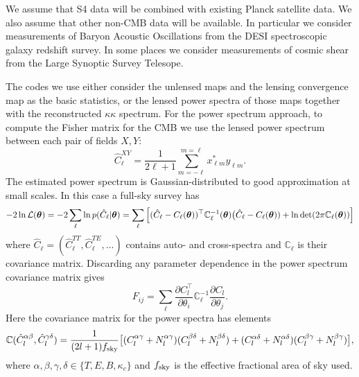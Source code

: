 We assume that S4 data will be combined with existing Planck satellite data. We also assume that other non-CMB data will be available. In particular we consider measurements of Baryon Acoustic Oscillations from the DESI spectroscopic galaxy redshift survey. In some places we consider measurements of cosmic shear from the Large Synoptic Survey Telesope.


The codes we use either consider the unlensed maps and the lensing convergence map as the basic statistics, or the lensed power spectra of those maps together with the reconstructed $\kappa \kappa$ spectrum. For the power spectrum approach, to compute the Fisher matrix for the CMB we use the lensed power spectrum between each pair of fields $X, Y$:
%
\begin{equation}
\label{eqEstimator}
\hat{C}^{XY}_\ell = \frac{1}{2\ell+1}\sum_{m=-\ell}^{m=\ell} x^{*}_{\ell m} y_{\ell m}.
\end{equation}
%
The estimated power spectrum is Gaussian-distributed to good approximation at small scales. In this case a full-sky survey has
%
\begin{equation}
-2\ln\mathcal{L}(\boldsymbol{\theta}) = -2\sum_\ell \ln p( \hat{C}_\ell | \boldsymbol{\theta}) \\
=  \sum_\ell  \Big[ (\hat{C}_\ell - C_\ell(\boldsymbol{\theta}) )^\top  \mathbb{C}^{-1}_\ell(\boldsymbol{\theta}) \big(\hat{C}_\ell - C_\ell(\boldsymbol{\theta})) + \ln \det(2 \pi \mathbb{C}_\ell(\boldsymbol{\theta})) \Big]
\end{equation}
%
where $ \hat{C}_\ell = (\hat{C}_\ell^{TT}, \hat{C}_\ell^{TE}, ...) $ contains auto- and cross-spectra and $\mathbb{C}_\ell$ is their covariance matrix. Discarding any parameter dependence in the power spectrum covariance matrix gives
%
\begin{equation}
F_{ij} = \sum_\ell \frac{\partial C^\top_l}{\partial \theta_i} \mathbb{C}^{-1}_\ell \frac{\partial C_l}{\partial \theta_j}.
\end{equation}
%
Here the covariance matrix for the power spectra has elements
%
\begin{equation}
\mathbb{C}(\hat{C}_l^{\alpha \beta}, \hat{C}_l^{\gamma \delta}) = \frac{1}{(2l+1)f_{\rm sky}} \big[ (C_l^{\alpha \gamma} + N_l^{\alpha \gamma}) (C_l^{\beta \delta} + N_l^{\beta \delta})  \\
+ (C_l^{\alpha \delta} + N_l^{\alpha \delta}) (C_l^{\beta \gamma} + N_l^{\beta \gamma}) \big],
\end{equation}
%
where $\alpha, \beta, \gamma, \delta \in \{T, E, B, \kappa_c\}$ and $f_{\rm sky}$ is the effective fractional area of sky used. 

